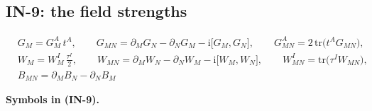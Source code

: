 \documentclass[
  10pt,
]{article}
\begin{document}
\hypertarget{in-9-the-field-strengths}{%
\subsection{IN-9: the field strengths}\label{in-9-the-field-strengths}}

\[
\begin{aligned}
&G_M = G^A_M\,t^A,\qquad G_{MN} = \partial_MG_N - \partial_NG_M - \mathrm{i}\big[G_M, G_N\big],\qquad
 G^A_{MN} = 2\,\mathrm{tr}\big(t^AG_{MN}\big),\\
&W_M = W^I_M\,\frac{\tau^I}{2},\qquad W_{MN} = \partial_MW_N - \partial_NW_M - \mathrm{i}\big[W_M,
 W_N\big],\qquad
 W^I_{MN} = \mathrm{tr}\big(\tau^IW_{MN}\big),\\
&B_{MN} = \partial_MB_N - \partial_NB_M
\end{aligned} \tag{IN-9}
\]

\textbf{Symbols in (IN-9).}
\end{document}
